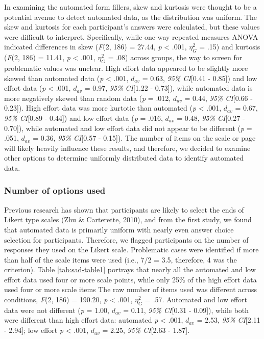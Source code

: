 \documentclass[english,man]{apa6}
\theoremstyle{definition}
\theoremstyle{definition}
\theoremstyle{definition}
\theoremstyle{remark}
\begin{document}
In examining the automated form fillers, skew and kurtosis were thought
to be a potential avenue to detect automated data, as the distribution
was uniform. The skew and kurtosis for each participant's answers were
calculated, but these values were difficult to interpret. Specifically,
while one-way repeated measures ANOVA indicated differences in skew
(\emph{F}(2, 186) = 27.44, \emph{p} \textless{} .001, \(\eta_G^2\) =
.15) and kurtosis (\emph{F}(2, 186) = 11.41, \emph{p} \textless{} .001,
\(\eta_G^2\) = .08) across groups, the way to screen for problematic
values was unclear. High effort data appeared to be slightly more skewed
than automated data (\emph{p} \textless{} .001, \(d_{av}\) = 0.63,
\emph{95\% CI}{[}0.41 - 0.85{]}) and low effort data (\emph{p}
\textless{} .001, \(d_{av}\) = 0.97, \emph{95\% CI}{[}1.22 - 0.73{]}),
while automated data is more negatively skewed than random data
(\emph{p} = .012, \(d_{av}\) = 0.44, \emph{95\% CI}{[}0.66 - 0.23{]}).
High effort data was more kurtotic than automated (\emph{p} \textless{}
.001, \(d_{av}\) = 0.67, \emph{95\% CI}{[}0.89 - 0.44{]}) and low effort
data (\emph{p} = .016, \(d_{av}\) = 0.48, \emph{95\% CI}{[}0.27 -
0.70{]}), while automated and low effort data did not appear to be
different (\emph{p} = .051, \(d_{av}\) = 0.36, \emph{95\% CI}{[}0.57 -
0.15{]}). The number of items on the scale or page will likely heavily
influence these results, and therefore, we decided to examine other
options to determine uniformly distributed data to identify automated
data.

\subsubsection{Number of options used}\label{number-of-options-used}

Previous research has shown that participants are likely to select the
ends of Likert type scales (Zhu \& Carterette, 2010), and from the first
study, we found that automated data is primarily uniform with nearly
even answer choice selection for participants. Therefore, we flagged
participants on the number of responses they used on the Likert scale.
Problematic cases were identified if more than half of the scale items
were used (i.e., 7/2 = 3.5, therefore, 4 was the criterion). Table
\ref{tab:sad-table1} portrays that nearly all the automated and low
effort data used four or more scale points, while only 25\% of the high
effort data used four or more scale items The raw number of items used
was different across conditions, \emph{F}(2, 186) = 190.20, \emph{p}
\textless{} .001, \(\eta_G^2\) = .57. Automated and low effort data were
not different (\emph{p} = 1.00, \(d_{av}\) = 0.11, \emph{95\% CI}{[}0.31
- 0.09{]}), while both were different than high effort data: automated
\emph{p} \textless{} .001, \(d_{av}\) = 2.53, \emph{95\% CI}{[}2.11 -
2.94{]}; low effort \emph{p} \textless{} .001, \(d_{av}\) = 2.25,
\emph{95\% CI}{[}2.63 - 1.87{]}.
\end{document}
